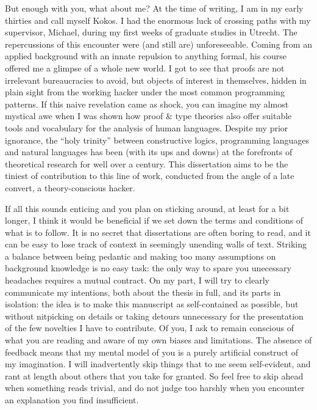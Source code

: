 {{	But enough with you, what about me? 
	At the time of writing, I am in my early thirties and call myself Kokos. 
	I had the enormous luck of crossing paths with my supervisor, Michael, during my first weeks of graduate studies in Utrecht. 
	The repercussions of this encounter were (and still are) unforeseeable. 
	Coming from an applied background with an innate repulsion to anything formal, his course offered me a glimpse of a whole new world. 
	I got to see that proofs are not irrelevant bureaucracies to avoid, but objects of interest in themselves, hidden in plain sight from the working hacker under the most common programming patterns. 
	If this naive revelation came as shock, you can imagine my almost mystical awe when I was shown how proof \& type theories also offer suitable tools and vocabulary for the analysis of human languages. 
	Despite my prior ignorance, the “holy trinity” between constructive logics, programming languages and natural languages has been (with its ups and downs) at the forefronts of theoretical research for well over a century. 
	This dissertation aims to be the tiniest of contribution to this line of work, conducted from the angle of a late convert, a theory-conscious hacker. 
	
	If all this sounds enticing and you plan on sticking around, at least for a bit longer, I think it would be beneficial if we set down the terms and conditions of what is to follow. 
	It is no secret that dissertations are often boring to read, and it can be easy to lose track of context in seemingly unending walls of text. 
	Striking a balance between being pedantic and making too many assumptions on background knowledge is no easy task: the only way to spare you unecessary headaches requires a mutual contract. 
	On my part, I will try to clearly communicate my intentions, both about the thesis in full, and its parts in isolation: the idea is to make this manuscript as self-contained as possible, but without nitpicking on details or taking detours unnecessary for the presentation of the few novelties I have to contribute.
	Of you, I ask to remain conscious of what you are reading and aware of my own biases and limitations. 
	The absence of feedback means that my mental model of you is a purely artificial construct of my imagination.
	I will inadvertently skip things that to me seem self-evident, and rant at length about others that you take for granted.
	So feel free to skip ahead when something reads trivial, and do not judge too harshly when you encounter an explanation you find insufficient.
	
}}
